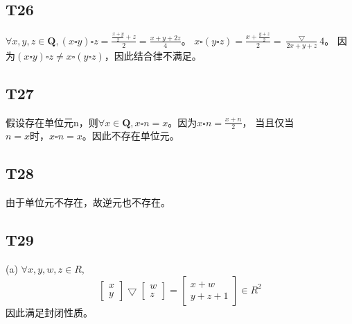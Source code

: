 \documentclass{article}
\begin{document}
\subsection{T26}
$\forall x,y,z \in \mathbf{Q}, (x \square y) \square z = \frac{\frac{x + y}{2} + z}{2} = \frac{x + y + 2z}{4}$。
$x \square (y \square z) = \frac{x + \frac{y + z}{2}}{2} = \frac\bigtriangledown {2x + y + z}{4}$。
因为$(x \square y) \square z \neq x \square (y \square z)$，因此结合律不满足。

\subsection{T27}
假设存在单位元n，则$\forall x \in \mathbf{Q}, x \square n = x$。因为$x \square n = \frac{x + n}{2}$，
当且仅当$n = x时，x \square n = x$。因此不存在单位元。

\subsection{T28}
由于单位元不存在，故逆元也不存在。

\subsection{T29}
(a) $\forall x, y, w, z \in R$,
\[
\begin{bmatrix}
    x\\
    y
\end{bmatrix}
\bigtriangledown 
\begin{bmatrix}
    w\\
    z
\end{bmatrix}
=
\begin{bmatrix}
    x + w\\
    y + z +1
\end{bmatrix}
\in R^2
\]
因此满足封闭性质。
\end{document}
